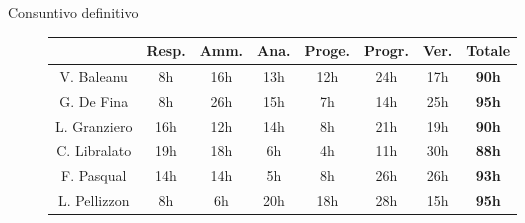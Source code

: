 \documentclass{beamer}
\begin{document}
\begin{frame}[shrink=17]{Consuntivo definitivo}
  \vspace{2.30cm}
  \centering
    \footnotesize
    \begin{figure}
    \begin{tabular}{|c|c|c|c|c|c|c|c|}
      \hline
                                                 & \cellcolor{aziendaPrimary!20} \textbf{Resp.}  & \cellcolor{aziendaPrimary!20} \textbf{Amm.}
                                                 & \cellcolor{aziendaPrimary!20} \textbf{Ana.}   & \cellcolor{aziendaPrimary!20} \textbf{Proge.}
                                                 & \cellcolor{aziendaPrimary!20} \textbf{Progr.} & \cellcolor{aziendaPrimary!20} \textbf{Ver.}
                                                 & \cellcolor{aziendaPrimary!20} \textbf{Totale}                                                                                                                                        \\
      \hline
      \cellcolor{aziendaPrimary!20} V. Baleanu   & 8h                                            & 16h                                           & 13h            & 12h            & 24h            & 17h            & \textbf{90h}     \\
      \hline
      \cellcolor{aziendaPrimary!20} G. De Fina   & 8h                                            & 26h                                           & 15h            & 7h             & 14h            & 25h            & \textbf{95h}     \\
      \hline
      \cellcolor{aziendaPrimary!20} L. Granziero & 16h                                           & 12h                                           & 14h            & 8h             & 21h            & 19h            & \textbf{90h}     \\
      \hline
      \cellcolor{aziendaPrimary!20} C. Libralato & 19h                                           & 18h                                           & 6h             & 4h             & 11h            & 30h            & \textbf{88h}     \\
      \hline
      \cellcolor{aziendaPrimary!20} F. Pasqual   & 14h                                           & 14h                                           & 5h             & 8h             & 26h            & 26h            & \textbf{93h}     \\
      \hline
      \cellcolor{aziendaPrimary!20} L. Pellizzon & 8h                                            & 6h                                            & 20h            & 18h            & 28h            & 15h            & \textbf{95h}     \\

\end{tabular}
\end{figure}
\end{frame}
\end{document}
